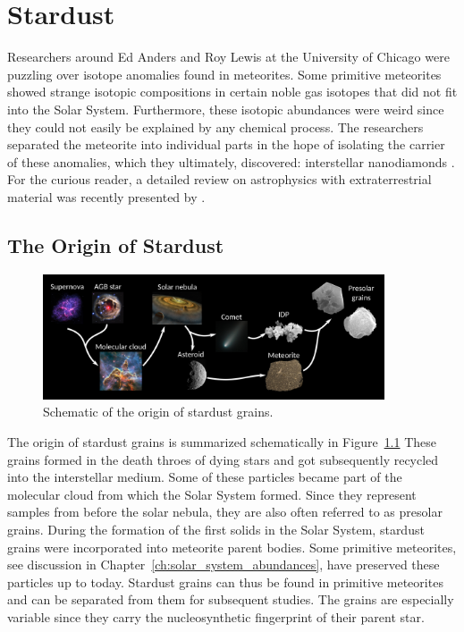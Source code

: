 
\chapter{Stardust}\label{ch:stardust}

Researchers around Ed Anders and Roy Lewis at the University of Chicago were puzzling over isotope anomalies found in meteorites. Some primitive meteorites showed strange isotopic compositions in certain noble gas isotopes that did not fit into the Solar System. Furthermore, these isotopic abundances were weird since they could not easily be explained by any chemical process. The researchers separated the meteorite into individual parts in the hope of isolating the carrier of these anomalies, which they ultimately, discovered: interstellar nanodiamonds \citep{lewis87}. For the curious reader, a detailed review on astrophysics with extraterrestrial material was recently presented by \citet{nittler16}.


\section{The Origin of Stardust}

\begin{figure}[tb]
    \centering
    \includegraphics[width=0.9\textwidth]{graphics/stardust/presolar_grains_origin_1600}
    \caption{Schematic of the origin of stardust grains.}
    \label{fig:stardust:origin_of_stardust_schematic}
\end{figure}
The origin of stardust grains is summarized schematically in Figure~\ref{fig:stardust:origin_of_stardust_schematic}
These grains formed in the death throes of dying stars and got subsequently recycled into the interstellar medium. Some of these particles became part of the molecular cloud from which the Solar System formed. Since they represent samples from before the solar nebula, they are also often referred to as presolar grains. During the formation of the first solids in the Solar System, stardust grains were incorporated into meteorite parent bodies. Some primitive meteorites, see discussion in Chapter~\ref{ch:solar_system_abundances}, have preserved these particles up to today. Stardust grains can thus be found in primitive meteorites and can be separated from them for subsequent studies. The grains are especially variable since they carry the nucleosynthetic fingerprint of their parent star.

